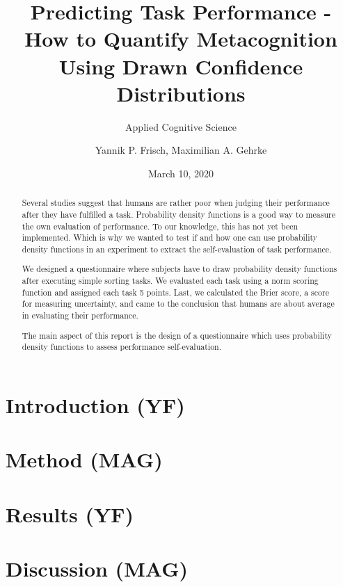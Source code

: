 \documentclass[
pdfa=false,  %
color=9c,
logo=body,
class=article,
marginpar=false,
logofile=../logos/tuda_logo.pdf
]{tudapub}
\author{Yannik P. Frisch, Maximilian A. Gehrke}
\title{Predicting Task Performance - How to Quantify Metacognition Using Drawn Confidence Distributions}
\date{March 10, 2020}
\subtitle{Applied Cognitive Science}
\begin{document}
\maketitle

\begin{abstract}
	Several studies suggest that humans are rather poor when judging their performance after they have fulfilled a task. Probability density functions is a good way to measure the own evaluation of performance. To our knowledge, this has not yet been implemented. Which is why we wanted to test if and how one can use probability density functions in an experiment to extract the self-evaluation of task performance.
	
	We designed a questionnaire where subjects have to draw probability density functions after executing simple sorting tasks. We evaluated each task using a norm scoring function and assigned each task 5 points. Last, we calculated the Brier score, a score for measuring uncertainty, and came to the conclusion that humans are about average in evaluating their performance.
	
	The main aspect of this report is the design of a questionnaire which uses probability density functions to assess performance self-evaluation. 
\end{abstract}

\newpage
\section{Introduction (YF)}
	\label{sec:introduction}
	
	
\newpage
\section{Method (MAG)}
	\label{sec:method}
	
	
\newpage
\section{Results (YF)}
	\label{sec:results}
	
	
\newpage
\section{Discussion (MAG)}
	\label{sec:discussion}
	
\end{document}

